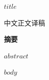 \documentclass[11pt,a4paper]{article}
\begin{document}
\begin{center}
{\LARGE\bfseries $title$\par}
\vspace{.6em}
{\small 中文正文译稿\par}
\end{center}
\vspace{.4em}
\noindent\textbf{摘要}\par
$abstract$
\par\vspace{.7em}
$body$
\FloatBarrier
\end{document}
